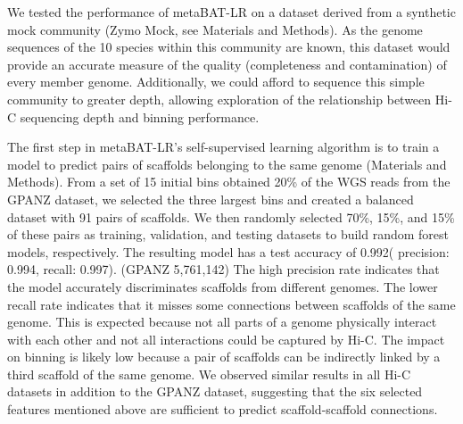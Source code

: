 \documentclass[fleqn,10pt,lineno]{wlpeerj}
\begin{document}
We tested the performance of metaBAT-LR on a dataset derived from a synthetic mock community (Zymo Mock, see Materials and Methods). As the genome sequences of the 10 species within this community are known, this dataset would provide an accurate measure of the quality (completeness and contamination) of every member genome. Additionally, we could afford to sequence this simple community to greater depth, allowing exploration of the relationship between Hi-C sequencing depth and binning performance.

The first step in metaBAT-LR's self-supervised learning algorithm is to train a model to predict pairs of scaffolds belonging to the same genome (Materials and Methods). From a set of 15 initial bins obtained 20\% of the WGS reads from the GPANZ dataset, we selected the three largest bins and created a balanced dataset with 91 pairs of scaffolds. We then randomly selected 70\%, 15\%, and 15\% of these pairs as training, validation, and testing datasets to build random forest models, respectively. The resulting model has a test accuracy of 0.992( precision: 0.994, recall: 0.997). (GPANZ 5,761,142) The high precision rate indicates that the model accurately discriminates scaffolds from different genomes. The lower recall rate indicates that it misses some connections between scaffolds of the same genome. This is expected because not all parts of a genome physically interact with each other and not all interactions could be captured by Hi-C. The impact on binning is likely low because a pair of scaffolds can be indirectly linked by a third scaffold of the same genome.  We observed similar results in all Hi-C datasets in addition to the GPANZ dataset, suggesting that the six selected features mentioned above are sufficient to predict scaffold-scaffold connections. 
\end{document}
